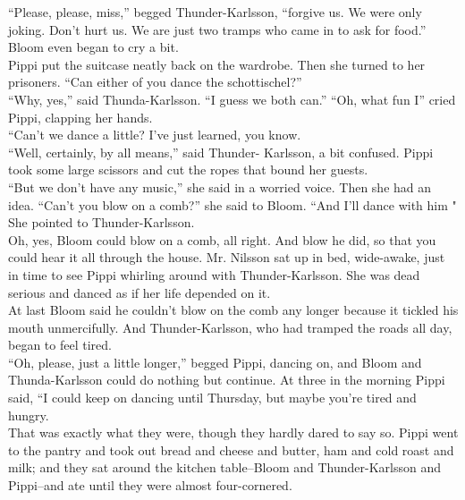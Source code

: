 \documentclass{standard}
\begin{document}
“Please, please, miss,” begged Thunder-Karlsson, “forgive us. We were only joking. Don’t hurt us. We are just two tramps who came in to ask for food.”\\

Bloom even began to cry a bit.\\

Pippi put the suitcase neatly back on the wardrobe. Then she turned to her prisoners. “Can either of you dance the schottischel?”\\

“Why, yes,” said Thunda-Karlsson. “I guess we both can.” “Oh, what fun I” cried Pippi, clapping her hands.\\

“Can’t we dance a little? I’ve just learned, you know.\\

“Well, certainly, by all means,” said Thunder- Karlsson, a bit confused. Pippi took some large scissors and cut the ropes that bound her guests.\\

“But we don’t have any music,” she said in a worried voice. Then she had an idea. “Can’t you blow on a comb?” she said to Bloom. “And I’ll dance with him " She pointed to Thunder-Karlsson.\\

Oh, yes, Bloom could blow on a comb, all right. And blow he did, so that you could hear it all through the house. Mr. Nilsson sat up in bed, wide-awake, just in time to see Pippi whirling around with Thunder-Karlsson. She was dead serious and danced as if her life depended on it.\\

At last Bloom said he couldn’t blow on the comb any longer because it tickled his mouth unmercifully. And Thunder-Karlsson, who had tramped the roads all day, began to feel tired.\\

“Oh, please, just a little longer,” begged Pippi, dancing on, and Bloom and Thunda-Karlsson could do nothing but continue. At three in the morning Pippi said, “I could keep on dancing until Thursday, but maybe you’re tired and hungry.\\

That was exactly what they were, though they hardly dared to say so. Pippi went to the pantry and took out bread and cheese and butter, ham and cold roast and milk; and they sat around the kitchen table--Bloom and Thunder-Karlsson and Pippi--and ate until they were almost four-cornered.\\
\end{document}
